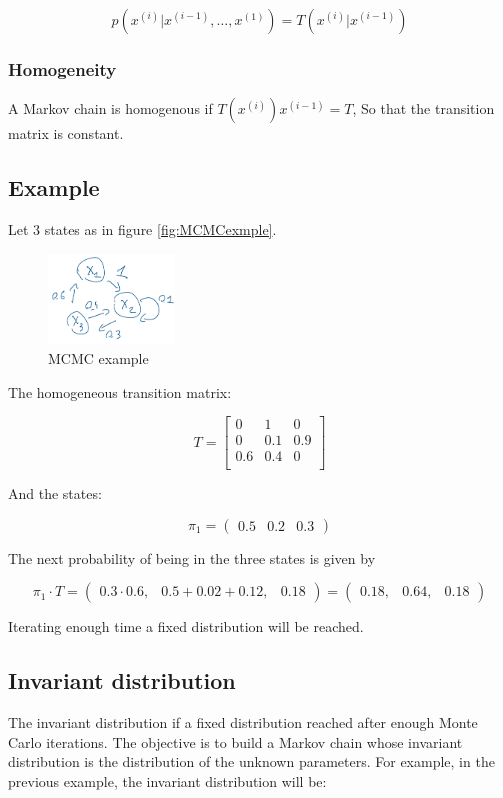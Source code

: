   $$p(x^{(i)}|x^{(i-1)},\dots,x^{(1)})=T(x^{(i)}|x^{(i-1)})$$

    \subsubsection{Homogeneity}
    A Markov chain is homogenous if $T(x^{(i)})x^{(i-1)}=T$,
    So that the transition matrix is constant.

  \subsection{Example}
  Let $3$ states as in figure \ref{fig:MCMCexmple}.

  \begin{figure}
    \centering
    \includegraphics[width=0.3\textwidth]{mcmc.png}
    \caption{MCMC example}
    \label{fig:MCMCexample}
  \end{figure}

  The homogeneous transition matrix:

  $$T = \begin{bmatrix}0 & 1 & 0\\0 & 0.1 & 0.9\\ 0.6 & 0.4 & 0\\\end{bmatrix}$$

  And the states:

  $$\pi_1=\begin{pmatrix}0.5 & 0.2& 0.3 \end{pmatrix}$$

  The next probability of being in the three states is given by

  $$\pi_1 \cdot T=\begin{pmatrix}0.3\cdot0.6, & 0.5+0.02+0.12,& 0.18 \end{pmatrix} = \begin{pmatrix}0.18, & 0.64,& 0.18 \end{pmatrix}$$

  Iterating enough time a fixed distribution will be reached.

  \subsection{Invariant distribution}
  The invariant distribution if a fixed distribution reached after enough Monte Carlo iterations.
  The objective is to build a Markov chain whose invariant distribution is the distribution of the unknown parameters.
  For example, in the previous example, the invariant distribution will be:

